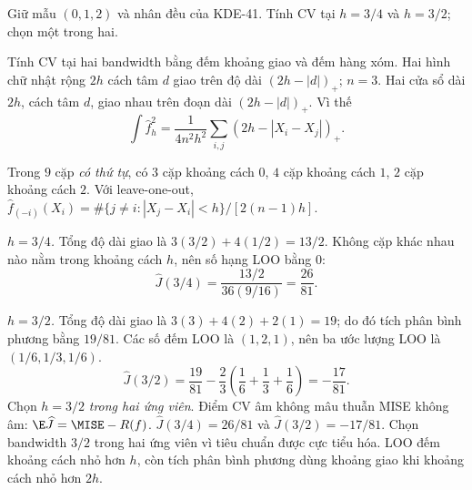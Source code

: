 \begin{problem}\label{k:42}
Giữ mẫu $(0,1,2)$ và nhân đều của KDE-41. Tính CV tại $h=3/4$ và $h=3/2$; chọn một trong hai.
\end{problem}
\begin{solution}
Tính CV tại hai bandwidth bằng đếm khoảng giao và đếm hàng xóm.
Hai hình chữ nhật rộng $2h$ cách tâm $d$ giao trên độ dài $(2h-|d|)_+$; $n=3$.
Hai cửa sổ dài $2h$, cách tâm $d$, giao nhau trên đoạn dài $(2h-|d|)_+$. Vì thế
\[
 \int\widehat f_h^2=\frac1{4n^2h^2}\sum_{i,j}(2h-|X_i-X_j|)_+.
\]

Trong $9$ cặp \emph{có thứ tự}, có $3$ cặp khoảng cách $0$, $4$ cặp khoảng cách $1$, $2$ cặp khoảng cách $2$.
Với leave-one-out,
$\widehat f_{(-i)}(X_i)=\#\{j\ne i:|X_j-X_i|<h\}/[2(n-1)h]$.

\emph{$h=3/4$.} Tổng độ dài giao là $3(3/2)+4(1/2)=13/2$.
Không cặp khác nhau nào nằm trong khoảng cách $h$, nên số hạng LOO bằng 0:
\[
 \widehat J(3/4)=\frac{13/2}{36(9/16)}=\frac{26}{81}.
\]

\emph{$h=3/2$.} Tổng độ dài giao là $3(3)+4(2)+2(1)=19$; do đó tích phân bình phương bằng $19/81$.
Các số đếm LOO là $(1,2,1)$, nên ba ước lượng LOO là $(1/6,1/3,1/6)$.
\[
 \widehat J(3/2)=\frac{19}{81}-\frac23\left(\frac16+\frac13+\frac16\right)
 =-\frac{17}{81}.
\]
Chọn $h=3/2$ \emph{trong hai ứng viên}. Điểm CV âm không mâu thuẫn MISE không âm: $\E\widehat J=\MISE-R(f)$.
$\widehat J(3/4)=26/81$ và $\widehat J(3/2)=-17/81$. Chọn bandwidth $3/2$ trong hai ứng viên vì tiêu chuẩn được cực tiểu hóa.
LOO đếm khoảng cách nhỏ hơn $h$, còn tích phân bình phương dùng khoảng giao khi khoảng cách nhỏ hơn $2h$.
\end{solution}

